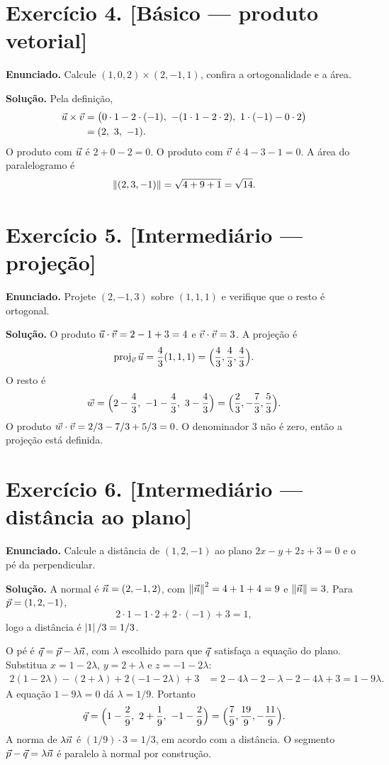 \documentclass[11pt,a4paper]{article}
\begin{document}
\section*{Exercício 4. [Básico --- produto vetorial]}

\textbf{Enunciado.} Calcule $(1,0,2)\times(2,-1,1)$, confira a ortogonalidade e a área.

\textbf{Solução.}
Pela definição,
\begin{align*}
\vet{u}\times\vet{v}
&=\bigl(0\cdot 1-2\cdot(-1),\ -(1\cdot 1-2\cdot 2),\ 1\cdot(-1)-0\cdot 2\bigr)\\
&=(2,\ 3,\ -1).
\end{align*}
O produto com $\vec{u}$ é $2+0-2=0$. O produto com $\vec{v}$ é $4-3-1=0$. A área do paralelogramo é
\[
\left\lVert (2,3,-1) \right\rVert=\sqrt{4+9+1}=\sqrt{14}.
\]

\section*{Exercício 5. [Intermediário --- projeção]}

\textbf{Enunciado.} Projete $(2,-1,3)$ sobre $(1,1,1)$ e verifique que o resto é ortogonal.

\textbf{Solução.}
O produto $\vec{u}\cdot\vec{v}=2-1+3=4$ e $\vec{v}\cdot\vec{v}=3$. A projeção é
\[
\operatorname{proj}_{\vec{v}}\vec{u}=\frac{4}{3}(1,1,1)=\Bigl(\frac43,\frac43,\frac43\Bigr).
\]
O resto é
\[
\vet{w}=\Bigl(2-\frac43,\ -1-\frac43,\ 3-\frac43\Bigr)
=\Bigl(\frac23,-\frac73,\frac53\Bigr).
\]
O produto $\vec{w}\cdot\vec{v}=2/3-7/3+5/3=0$. O denominador $3$ não é zero, então a projeção está definida.

\section*{Exercício 6. [Intermediário --- distância ao plano]}

\textbf{Enunciado.} Calcule a distância de $(1,2,-1)$ ao plano $2x-y+2z+3=0$ e o pé da perpendicular.

\textbf{Solução.}
A normal é $\vec{n}=(2,-1,2)$, com $\left\lVert \vec{n} \right\rVert^2=4+1+4=9$ e $\left\lVert \vec{n} \right\rVert=3$. Para $\vec{p}=(1,2,-1)$,
\[
2\cdot 1-1\cdot 2+2\cdot(-1)+3=1,
\]
logo a distância é $\left\lvert 1 \right\rvert/3=1/3$.

O pé é $\vec{q}=\vec{p}-\lambda\vec{n}$, com $\lambda$ escolhido para que $\vec{q}$ satisfaça a equação do plano. Substitua $x=1-2\lambda$, $y=2+\lambda$ e $z=-1-2\lambda$:
\begin{align*}
2(1-2\lambda)-(2+\lambda)+2(-1-2\lambda)+3
&=2-4\lambda-2-\lambda-2-4\lambda+3
=1-9\lambda.
\end{align*}
A equação $1-9\lambda=0$ dá $\lambda=1/9$. Portanto
\[
\vec{q}
=\Bigl(1-\frac{2}{9},\ 2+\frac{1}{9},\ -1-\frac{2}{9}\Bigr)
=\Bigl(\frac{7}{9},\frac{19}{9},-\frac{11}{9}\Bigr).
\]
A norma de $\lambda\vec{n}$ é $(1/9)\cdot 3=1/3$, em acordo com a distância. O segmento $\vec{p}-\vec{q}=\lambda\vec{n}$ é paralelo à normal por construção.
\end{document}
